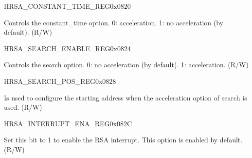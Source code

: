 \begin{register}{H}{RSA\_CONSTANT\_TIME\_REG}{0x{}0820}\label{regdesc:RSACONSTANTTIMEREG}
%
%
\regnewline%
\begin{regdesc}\begin{reglist}
\item [RSA\_CONSTANT\_TIME\_REG] Controls the constant\_time option. 0: acceleration. 1: no acceleration (by default). (R/W)
\end{reglist}\end{regdesc}
\end{register}


\begin{register}{H}{RSA\_SEARCH\_ENABLE\_REG}{0x{}0824}\label{regdesc:RSASEARCHENABLEREG}
%
%
\regnewline%
\begin{regdesc}\begin{reglist}
\item [RSA\_SEARCH\_ENABLE] Controls the search option. 0: no acceleration (by default). 1: acceleration. (R/W)
\end{reglist}\end{regdesc}
\end{register}



\begin{register}{H}{RSA\_SEARCH\_POS\_REG}{0x{}0828}\label{regdesc:RSASEARCHPOSREG}
%
%
\regnewline%
\begin{regdesc}\begin{reglist}
\item [RSA\_SEARCH\_POS] Is used to configure the starting address when the acceleration option of search is used. (R/W)
\end{reglist}\end{regdesc}
\end{register}


\begin{register}{H}{RSA\_INTERRUPT\_ENA\_REG}{0x{}082C}\label{regdesc:RSAINTERRUPTENAREG}
%
%
\regnewline%
\begin{regdesc}\begin{reglist}
\item [RSA\_INTERRUPT\_ENA] Set this bit to 1 to enable the RSA interrupt. This option is enabled by default. (R/W)
\end{reglist}\end{regdesc}
\end{register}


